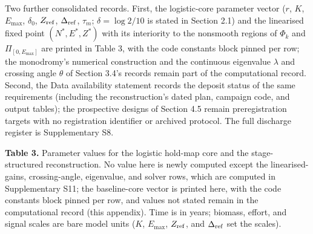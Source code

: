 \documentclass[11pt]{article}
\begin{document}
Two further consolidated records. First, the logistic-core parameter
vector (\(r\), \(K\), \(E_{\max}\), \(\delta_0\), \(Z_{\rm ref}\),
\(\Delta_{\rm ref}\), \(\tau_m\); \(\delta = \log 2/10\) is stated in
Section 2.1) and the linearised fixed point \((N^*, E^*, Z^*)\) with its
interiority to the nonsmooth regions of \(\Phi_k\) and
\(\Pi_{[0,E_{\max}]}\) are printed in Table 3, with the code constants
block pinned per row; the monodromy's numerical construction and the
continuous eigenvalue \(\lambda\) and crossing angle \(\theta\) of
Section 3.4's records remain part of the computational record. Second, the Data
availability statement records the deposit status of the same
requirements (including the reconstruction's dated plan, campaign code,
and output tables); the prospective designs of Section 4.5 remain
preregistration targets with no registration identifier or archived
protocol. The full discharge register is Supplementary S8.

\textbf{Table 3.} Parameter values for the
logistic hold-map core and the stage-structured reconstruction. No value here is newly computed except the linearised-gains, crossing-angle, eigenvalue, and solver rows, which are computed in Supplementary S11; the baseline-core vector is printed here, with the code constants block pinned per row, and values not stated remain in
the computational record (this appendix). Time is in years; biomass, effort, and signal scales are bare model units (\(K\), \(E_{\max}\), \(Z_{\rm ref}\), and \(\Delta_{\rm ref}\) set the scales).
\end{document}
